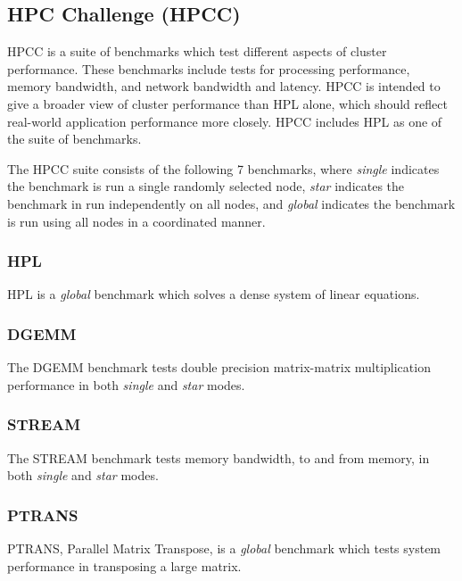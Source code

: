 %
%
\subsection{HPC Challenge (HPCC)}

HPCC is a suite of benchmarks which test different aspects of cluster performance. These benchmarks include tests for processing performance, memory bandwidth, and network bandwidth and latency. HPCC is intended to give a broader view of cluster performance than HPL alone, which should reflect real-world application performance more closely. HPCC includes HPL as one of the suite of benchmarks.

The HPCC suite consists of the following 7 benchmarks, where \emph{single} indicates the benchmark is run a single randomly selected node, \emph{star} indicates the benchmark in run independently on all nodes, and \emph{global} indicates the benchmark is run using all nodes in a coordinated manner. 


%
%
\subsubsection{HPL}

HPL is a \emph{global} benchmark which solves a dense system of linear equations.


%
%
\subsubsection{DGEMM}

The DGEMM benchmark tests double precision matrix-matrix multiplication performance in both \emph{single} and \emph{star} modes.

 
%
%
\subsubsection{STREAM}

The STREAM benchmark tests memory bandwidth, to and from memory, in both \emph{single} and \emph{star} modes.


%
%
\subsubsection{PTRANS}

PTRANS, Parallel Matrix Transpose, is a \emph{global} benchmark which tests system performance in transposing a large matrix.


